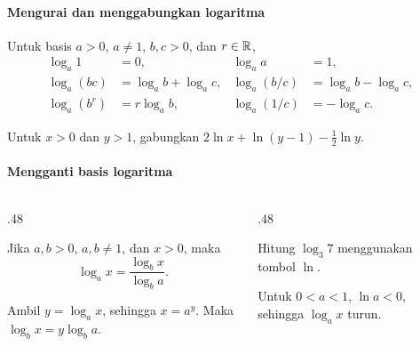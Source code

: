 \documentclass{../../kalkulus-ppt}
\begin{document}
\begin{frame}{\insertsection}
    \framesubtitle{Mengurai dan menggabungkan logaritma}
    \begin{teorema}
        Untuk basis $a>0$, $a\ne1$, $b,c>0$, dan $r\in\mathbb{R}$,
        \[
            \begin{aligned}
                \log_a 1&=0,& \log_a a&=1,\\
                \log_a(bc)&=\log_a b+\log_a c,&
                \log_a(b/c)&=\log_a b-\log_a c,\\
                \log_a(b^r)&=r\log_a b,& \log_a(1/c)&=-\log_a c.
            \end{aligned}
        \]
    \end{teorema}
    \begin{contoh}
        Untuk $x>0$ dan $y>1$, gabungkan $2\ln x+\ln(y-1)-\tfrac12\ln y$.
    \end{contoh}
\end{frame}

\begin{frame}{\insertsection}
    \framesubtitle{Mengganti basis logaritma}
    \begin{columns}[c,onlytextwidth]
        \begin{column}{.48\textwidth}
            \begin{teorema}
                Jika $a,b>0$, $a,b\ne1$, dan $x>0$, maka
                \[
                    \log_a x=\frac{\log_b x}{\log_b a}.
                \]
            \end{teorema}
            Ambil $y=\log_a x$, sehingga $x=a^y$.
            Maka $\log_b x=y\log_b a$.
        \end{column}
        \begin{column}{.48\textwidth}
            \begin{contoh}
                Hitung $\log_3 7$ menggunakan tombol $\ln$.
            \end{contoh}
            Untuk $0<a<1$, $\ln a<0$, sehingga $\log_a x$ turun.
        \end{column}
    \end{columns}
\end{frame}
\end{document}
